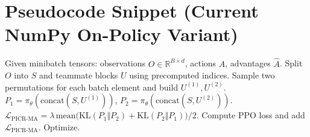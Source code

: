 \documentclass[nohyperref]{article}
\newcommand{\method}{PICR-MA} %
\newcommand{\R}{\mathbb{R}}
\newcommand{\KL}{\mathrm{KL}}
\begin{document}
\section{Pseudocode Snippet (Current NumPy On-Policy Variant)}
\begin{algorithm}[H]
\caption{Core training step with permutation KL}
\begin{algorithmic}[1]
\STATE Given minibatch tensors: observations $O \in \R^{B\times d}$, actions $A$, advantages $\hat{A}$.
\STATE Split $O$ into $S$ and teammate blocks $U$ using precomputed indices.
\STATE Sample two permutations for each batch element and build $U^{(1)}, U^{(2)}$.
\STATE $P_1 = \pi_\theta(\mathrm{concat}(S, U^{(1)}))$, $P_2 = \pi_\theta(\mathrm{concat}(S, U^{(2)}))$.
\STATE $\mathcal{L}_{\text{\method}} = \lambda\, \mathrm{mean} \big( \KL(P_1\Vert P_2) + \KL(P_2\Vert P_1) \big)/2$.
\STATE Compute PPO loss and add $\mathcal{L}_{\text{\method}}$. Optimize.
\end{algorithmic}
\end{algorithm}
\end{document}
